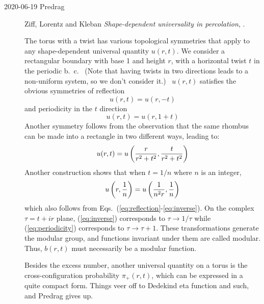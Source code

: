 \begin{description}
\item[2020-06-19 Predrag]
Ziff, Lorentz and Kleban
{\em Shape-dependent universality in percolation},
.

The torus with a twist has various topological symmetries
that apply to any shape-dependent universal quantity $u(r,t)$.  We consider a rectangular boundary
with base 1 and height $r$, with a horizontal twist $t$ in the
periodic b.~c. \   (Note that having twists in two directions leads to a
non-uniform system, so we don't consider it.) \   $u(r,t)$ satisfies the obvious symmetries
of reflection
\begin{equation}
u(r,t) = u(r,-t)
\label{eq:reflection}
\end{equation}
and  periodicity in the $t$ direction
\begin{equation}
u(r,t) = u(r,1+t)
\label{eq:periodicity}
\end{equation}
Another symmetry follows from the
observation that the same rhombus can be made into a rectangle
in two different ways, leading to:
\begin{equation}
u(r,t) = u\left({r \over r^2 + t^2},{t \over r^2 + t^2}\right)
\label{eq:inverse}
\end{equation}
Another construction
shows that when  $t = 1/n$ where $n$ is an integer,
\begin{equation}
u\left(r,{1 \over n}\right) = u\left({1\over n^2 r},{1 \over n}\right)
\label{eq:integer}
\end{equation}
which also follows from Eqs.\ (\ref{eq:reflection}-\ref{eq:inverse}). On
the complex $\tau = t + ir$ plane, (\ref{eq:inverse}) corresponds to
$\tau \to 1/\tau$ while (\ref{eq:periodicity}) corresponds to $\tau \to
\tau + 1$.  These transformations generate the modular group, and
functions invariant under them are called modular.  Thus, $b(r,t)$ must
necessarily be a modular function.

Besides the excess number, another universal
 quantity on a torus is the cross-configuration probability
$\pi_+(r,t)$, which can be expressed in a quite compact form.
Things veer off to Dedekind eta function and such, and Predrag gives up.



\end{description}
